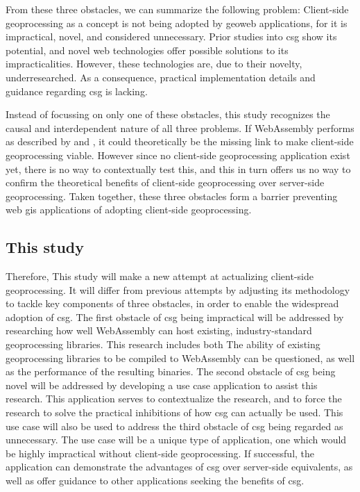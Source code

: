 From these three obstacles, we can summarize the following problem: 
Client-side geoprocessing as a concept is not being adopted by geoweb applications, for it is impractical, novel, and considered unnecessary. 
Prior studies into \ac{csg} show its potential, and novel web technologies offer possible solutions to its impracticalities. However, these technologies are, due to their novelty, underresearched. As a consequence,  practical implementation details and guidance regarding \ac{csg} is lacking.

Instead of focussing on only one of these obstacles, this study recognizes the causal and interdependent nature of all three problems. If WebAssembly performs as described by \cite{haas_bringing_2017} and \cite{jangda_not_2019}, it could theoretically be the missing link to make client-side geoprocessing viable. However since no client-side geoprocessing application exist yet, there is no way to contextually test this, and this in turn offers us no way to confirm the theoretical benefits of client-side geoprocessing over server-side geoprocessing. Taken together, these three obstacles form a barrier preventing web \ac{gis} applications of adopting client-side geoprocessing. 

\subsection{This study}

Therefore, This study will make a new attempt at actualizing client-side geoprocessing. It will differ from previous attempts by adjusting its methodology to tackle key components of three obstacles, in order to enable the widespread adoption of \ac{csg}.
The first obstacle of \ac{csg} being impractical will be addressed by researching how well WebAssembly can host existing, industry-standard geoprocessing libraries. 
This research includes both The ability of existing geoprocessing libraries to be compiled to WebAssembly can be questioned, as well as the performance of the resulting binaries.  
The second obstacle of \ac{csg} being novel will be addressed by developing a use case application to assist this research. This application serves to contextualize the research, and to force the research to solve the practical inhibitions of how \ac{csg} can actually be used. 
This use case will also be used to address the third obstacle of \ac{csg} being regarded as unnecessary. The use case will be a unique type of application, one which would be highly impractical without client-side geoprocessing. 
If successful, the application can demonstrate the advantages of \ac{csg} over server-side equivalents, as well as offer guidance to other applications seeking the benefits of \ac{csg}.

